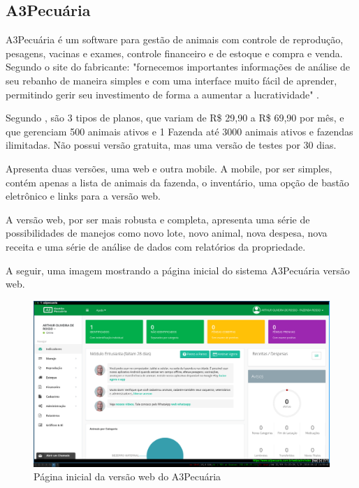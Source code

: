 \documentclass[12pt]{article}
\begin{document}

\newpage

\subsection{A3Pecuária}

A3Pecuária é um software para gestão de animais com controle de reprodução, pesagens, vacinas e exames, controle financeiro e de estoque e compra e venda. Segundo o site do fabricante: "fornecemos importantes informações de análise de seu rebanho de maneira simples e com uma interface muito fácil de aprender, permitindo gerir seu investimento de forma a aumentar a lucratividade"  \cite{a3pecuaria16}.

Segundo , são 3 tipos de planos, que variam de R\$ 29,90 a R\$ 69,90 por mês, e que gerenciam 500 animais ativos e 1 Fazenda até 3000 animais ativos e fazendas ilimitadas. Não possui versão gratuita, mas uma versão de testes por 30 dias.

Apresenta duas versões, uma web e outra mobile. A mobile, por ser simples, contém apenas a lista de animais da fazenda, o inventário, uma opção de bastão eletrônico e links para a versão web.

A versão web, por ser mais robusta e completa, apresenta uma série de possibilidades de manejos como novo lote, novo animal, nova despesa, nova receita e uma série de análise de dados com relatórios da propriedade.

A seguir, uma imagem mostrando a página inicial do sistema A3Pecuária versão web.

\newpage

\begin{figure}[!h]
	\begin{center}
		\caption{Página inicial da versão web do A3Pecuária}
		\includegraphics[width=6in]{img/a3pecuaria.png}

	\end{center}
\end{figure}
\end{document}

